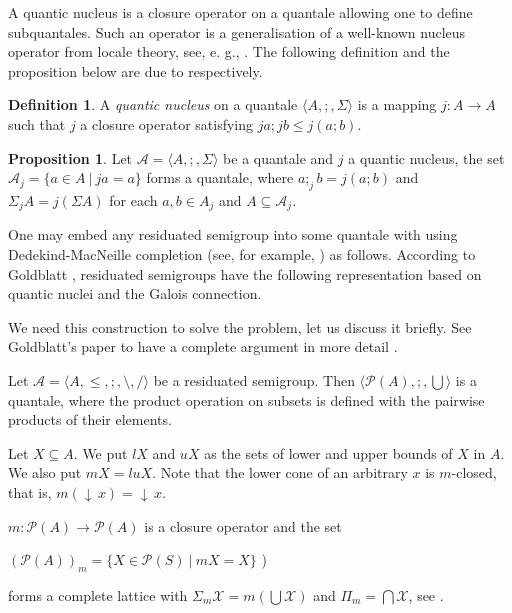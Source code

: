 \documentclass[a4paper]{article}
\theoremstyle{definition}
\newtheorem{definition}{Definition}
\theoremstyle{theorem}
\theoremstyle{proposition}
\newtheorem{proposition}{Proposition}
\theoremstyle{lemma}
\theoremstyle{ex}
\theoremstyle{corollary}
\theoremstyle{claim}
\newcommand{\down}[1]{\ensuremath{{\downarrow}\,#1}}
\begin{document}
A quantic nucleus is a closure operator on a quantale allowing one to define subquantales. Such an operator is a generalisation of a well-known nucleus operator from locale theory, see, e. g., \cite{bezhanishvili2016locales}. The following definition and the proposition below are due to \cite[Definition 3.1.1, Theorem 3.1.1]{rosenthal1990quantales} respectively.
\begin{definition}
  A \emph{quantic nucleus} on a quantale $\langle A, ;, \Sigma \rangle$ is a mapping $j : A \to A$ such that $j$ a closure operator satisfying $j a ; j b \leq j (a ; b)$.
\end{definition}

\begin{proposition} \label{subsemi}
  Let $\mathcal{A} = \langle A, ;, \Sigma \rangle$ be a quantale and $j$ a quantic nucleus, the set
  $\mathcal{A}_j = \{ a \in A \: | \: j a = a \}$ forms a quantale, where $a ;_j b = j(a ; b)$ and $\Sigma_j A = j (\Sigma A)$ for each $a, b \in {A}_j$ and $A \subseteq \mathcal{A}_j$.
\end{proposition}

One may embed any residuated semigroup into some quantale with using Dedekind-MacNeille completion (see, for example, \cite{theunissen2007macneille}) as follows. According to Goldblatt \cite{goldblatt2006kripke}, residuated semigroups have the following representation based on quantic nuclei and the Galois connection.

We need this construction to solve the problem, let us discuss it briefly. See Goldblatt's paper to have a complete argument in more detail \cite{goldblatt2006kripke}.

Let $\mathcal{A} = \langle A, \leq, ;, \setminus, / \rangle$ be a residuated semigroup. Then $\langle \mathcal{P}(A), ;, \bigcup \rangle$ is a quantale, where the product operation on subsets is defined with the pairwise products of their elements.

Let $X \subseteq A$. We put $lX$ and $uX$ as the sets of lower and upper bounds of $X$ in $A$. We also put $m X = lu X$.
Note that the lower cone of an arbitrary $x$ is $m$-closed, that is,
$m (\down{x}) = \down{x}$.

$m : \mathcal{P}(A) \to \mathcal{P}(A)$ is a closure operator and the set

\begin{center}
$(\mathcal{P}(A))_m = \{ X \in \mathcal{P}(S) \: | \: m X = X\}$ )
\end{center}
forms a complete lattice with $\Sigma_{m} \mathcal{X} = m ( \bigcup \mathcal{X})$ and $\Pi_{m} = \bigcap \mathcal{X}$, see \cite[Theorem 7.3]{davey2002introduction}.
\end{document}
